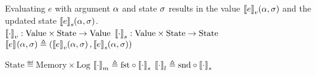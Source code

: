 

Evaluating $e$ with argument $\targ$ and state $\tmem$ results in the value $\denotefv{e}{\targ,\tmem}$ and the updated state $\denotefs{e}{\targ,\tmem}$.\\
$\denotevalue{\cdot} : \mathrm{Value} \times \mathrm{State} \to \mathrm{Value}$\quad\quad
$\denotestate{\cdot} : \mathrm{Value} \times \mathrm{State} \to \mathrm{State}$\quad\quad
$\denotef{e}{\targ,\tmem} \eqdef \left(\denotefv{e}{\targ,\tmem},\denotefs{e}{\targ,\tmem}\right)$

$\mathrm{State} \eqdef \mathrm{Memory} \times \mathrm{Log}$\quad\quad
$\denotesub{m}{\cdot} \triangleq \mathrm{fst} \circ \denotestate{\cdot}$\quad\quad
$\denotesub{l}{\cdot} \triangleq \mathrm{snd} \circ \denotestate{\cdot}$

